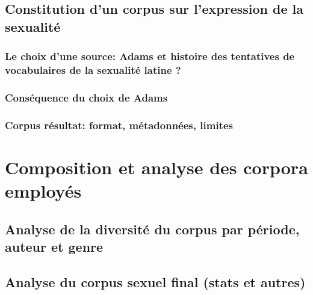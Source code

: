 
\subsection{Constitution d’un corpus sur l’expression de la sexualité}

\subsubsection{Le choix d’une source: Adams et histoire des tentatives de vocabulaires de la sexualité latine ?}


\subsubsection{Conséquence du choix de Adams}



\subsubsection{Corpus résultat: format, métadonnées, limites}



\section{Composition et analyse des corpora employés}

\subsection{Analyse de la diversité du corpus par période, auteur et genre}


\subsection{Analyse du corpus sexuel final (stats et autres)}
